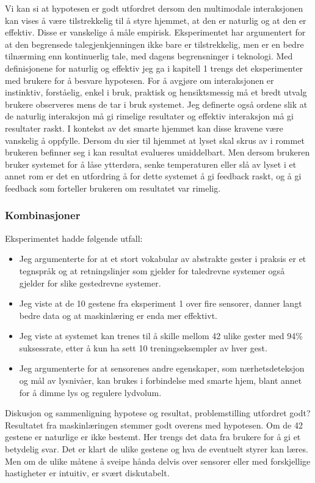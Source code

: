 Vi kan si at hypotesen er godt utfordret dersom den multimodale interaksjonen kan vises å være tilstrekkelig til å styre hjemmet, at den er naturlig og at den er effektiv. Disse er vanskelige å måle empirisk. Eksperimentet har argumentert for at den begrensede talegjenkjenningen ikke bare er tilstrekkelig, men er en bedre tilnærming enn kontinuerlig tale, med dagens begrensninger i teknologi. Med definisjonene for naturlig og effektiv jeg ga i kapitell 1 trengs det eksperimenter med brukere for å besvare hypotesen. For å avgjøre om interaksjonen er instinktiv, forståelig, enkel i bruk, praktisk og hensiktsmessig må et bredt utvalg brukere observeres mens de tar i bruk systemet. Jeg definerte også ordene slik at de naturlig interaksjon må gi rimelige resultater og effektiv interaksjon må gi resultater raskt. I kontekst av det smarte hjemmet kan disse kravene være vanskelig å oppfylle. Dersom du sier til hjemmet at lyset skal skrus av i rommet brukeren befinner seg i kan resultat evalueres umiddelbart. Men dersom brukeren bruker systemet for å låse ytterdøra, senke temperaturen eller slå av lyset i et annet rom er det en utfordring å for dette systemet å gi feedback raskt, og å gi feedback som forteller brukeren om resultatet var rimelig.

\subsubsection*{Kombinasjoner}
Eksperimentet hadde følgende utfall:
\begin{itemize}
\item Jeg argumenterte for at et stort vokabular av abstrakte gester i praksis er et tegnspråk og at retningslinjer som gjelder for taledrevne systemer også gjelder for slike gestedrevne systemer.
\item Jeg viste at de 10 gestene fra eksperiment 1 over fire sensorer, danner langt bedre data og at maskinlæring er enda mer effektivt.
\item Jeg viste at systemet kan trenes til å skille mellom 42 ulike gester med 94\% suksessrate, etter å kun ha sett 10 treningseksempler av hver gest.
\item Jeg argumenterte for at sensorenes andre egenskaper, som nærhetsdeteksjon og mål av lysnivåer, kan brukes i forbindelse med smarte hjem, blant annet for å dimme lys og regulere lydvolum.
\end{itemize}

Diskusjon og sammenligning hypotese og resultat, problemstilling utfordret godt?
Resultatet fra maskinlæringen stemmer godt overens med hypotesen. Om de 42 gestene er naturlige er ikke bestemt. Her trengs det data fra brukere for å gi et betydelig svar. Det er klart de ulike gestene og hva de eventuelt styrer kan læres. Men om de ulike måtene å sveipe hånda delvis over sensorer eller med forskjellige hastigheter er intuitiv, er svært diskutabelt.

